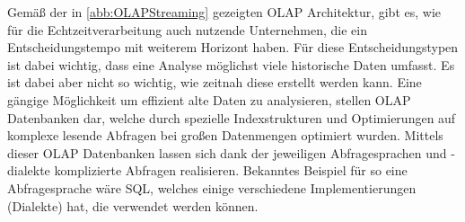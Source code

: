 Gemäß der in \autoref{abb:OLAPStreaming} gezeigten \ac{OLAP} Architektur, gibt es, wie für die Echtzeitverarbeitung auch nutzende Unternehmen, die ein Entscheidungstempo mit weiterem Horizont haben. Für diese Entscheidungstypen ist dabei wichtig, dass eine Analyse möglichst viele historische Daten umfasst. Es ist dabei aber nicht so wichtig, wie zeitnah diese erstellt werden kann. 
Eine gängige Möglichkeit um effizient alte Daten zu analysieren, stellen \ac{OLAP} Datenbanken dar, welche durch spezielle Indexstrukturen und Optimierungen auf komplexe lesende Abfragen bei großen Datenmengen optimiert wurden.  Mittels dieser \ac{OLAP} Datenbanken lassen sich dank der jeweiligen Abfragesprachen und -dialekte komplizierte Abfragen realisieren. Bekanntes Beispiel für so eine Abfragesprache wäre \ac{SQL}, welches einige verschiedene Implementierungen (Dialekte) hat, die verwendet werden können. 



